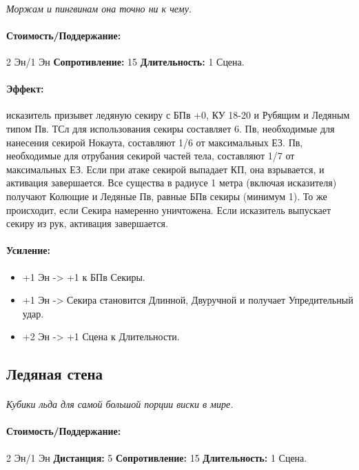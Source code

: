 \begin{itemize}
\begin{itemize}
\paragraph{} 
\textit{
\tbd Моржам и пингвинам она точно ни к чему.}
\paragraph{Стоимость/Поддержание: }2 Эн/1 Эн
\newline
\textbf{Сопротивление: }15
\newline 
\textbf{Длительность: }1 Сцена.
\paragraph{Эффект: }исказитель призывет ледяную секиру с БПв +0, КУ 18-20 и Рубящим и Ледяным типом Пв. ТСл для использования секиры составляет 6. Пв, необходимые для нанесения секирой Нокаута, составляют 1/6 от максимальных ЕЗ. Пв, необходимые для отрубания секирой частей тела, составляют 1/7 от максимальных ЕЗ. 
\newline Если при атаке секирой выпадает КП, она взрывается, и активация завершается. Все существа в радиусе 1 метра (включая исказителя) получают Колющие и Ледяные Пв, равные БПв секиры (минимум 1). То же происходит, если Секира намеренно уничтожена. 
\newline Если исказитель выпускает секиру из рук, активация завершается.
\paragraph{Усиление:}
\begin{itemize}
\item+1 Эн -> +1 к БПв Секиры.
\item+1 Эн -> Секира становится Длинной, Двуручной и получает Упредительный удар.
\item+2 Эн -> +1 Сцена к Длительности.
\end{itemize}
\subsection{Ледяная стена}
\paragraph{} 
\textit{Кубики льда для самой большой порции виски в мире.}
\paragraph{Стоимость/Поддержание: }2 Эн/1 Эн
\newline
\textbf{Дистанция: }5
\newline
\textbf{Сопротивление: }15
\newline 
\textbf{Длительность: }1 Сцена.

\end{itemize}
\end{itemize}
